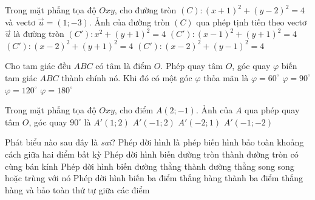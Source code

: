 \begin{ex}%
	Trong mặt phẳng tọa độ $Oxy$, cho đường tròn $(C)\colon (x+1)^2+(y-2)^2=4$ và vectơ $\overrightarrow{u}=(1;-3)$. Ảnh của đường tròn $(C)$ qua phép tịnh tiến theo vectơ $\overrightarrow{u}$ là đường tròn
	\choice
	{\True $(C')\colon x^2+(y+1)^2=4$}
	{$(C')\colon (x-1)^2+(y+1)^2=4$}
	{$(C')\colon (x-2)^2+(y+1)^2=4$}
	{$(C')\colon (x-2)^2+(y-1)^2=4$}
\end{ex}
\begin{ex}%
	Cho tam giác đều $ABC$ có tâm là điểm $O$. Phép quay tâm $O$, góc quay $\varphi$ biến tam giác $ABC$ thành chính nó. Khi đó có một góc $\varphi$ thỏa mãn là
	\choice
	{$\varphi =60^{\circ}$}
	{$\varphi =90^{\circ}$}
	{\True $\varphi =120^{\circ}$}
	{$\varphi =180^{\circ}$}
	\loigiai{}
\end{ex}
\begin{ex}%
	Trong mặt phẳng tọa độ $Oxy$, cho điểm $A(2;-1)$. Ảnh của $A$ qua phép quay tâm $O$, góc quay $90^{\circ}$ là 
	\choice
	{\True $A'(1;2)$}
	{$A'(-1;2)$}
	{$A'(-2;1)$}
	{$A'(-1;-2)$}
\end{ex}
\begin{ex}%
	Phát biểu nào sau đây là \textit{sai}?
	\choice
	{Phép dời hình là phép biến hình bảo toàn khoảng cách giữa hai điểm bất kỳ}
	{Phép dời hình biến đường tròn thành đường tròn có cùng bán kính}
	{\True Phép dời hình biến đường thẳng thành đường thẳng song song hoặc trùng với nó}
	{Phép dời hình biến ba điểm thẳng hàng thành ba điểm thẳng hàng và bảo toàn thứ tự giữa các điểm}
\end{ex}
